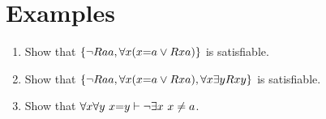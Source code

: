 \documentclass[a4paper, 11pt]{article} %
\begin{document}




\section*{Examples}

\begin{enumerate}
\item Show that $\lbrace{\neg}Raa, \forall x (x{=}a \vee Rxa)\rbrace$ is satisfiable. 
  \item Show that $\lbrace{\neg}Raa, \forall x (x{=}a \vee Rxa), \forall x\exists yRxy\rbrace$ is satisfiable. 
\item Show that $\forall x\forall y\ x{=}y \vdash \neg \exists x\ x \neq a$.
\end{enumerate}
\end{document}
